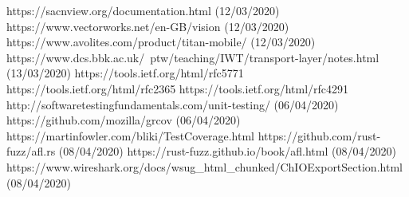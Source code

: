 \documentclass[11pt,a4paper]{article}
\begin{document}
\begin{thebibliography}{9}
	https://sacnview.org/documentation.html (12/03/2020)
	https://www.vectorworks.net/en-GB/vision (12/03/2020)
	https://www.avolites.com/product/titan-mobile/ (12/03/2020)
	https://www.dcs.bbk.ac.uk/~ptw/teaching/IWT/transport-layer/notes.html (13/03/2020)
	https://tools.ietf.org/html/rfc5771
	https://tools.ietf.org/html/rfc2365
	https://tools.ietf.org/html/rfc4291
	http://softwaretestingfundamentals.com/unit-testing/ (06/04/2020)
	https://github.com/mozilla/grcov (06/04/2020)
	https://martinfowler.com/bliki/TestCoverage.html
	https://github.com/rust-fuzz/afl.rs (08/04/2020)
	https://rust-fuzz.github.io/book/afl.html (08/04/2020)
	https://www.wireshark.org/docs/wsug\_html\_chunked/ChIOExportSection.html (08/04/2020)
\end{thebibliography}
\end{document}

